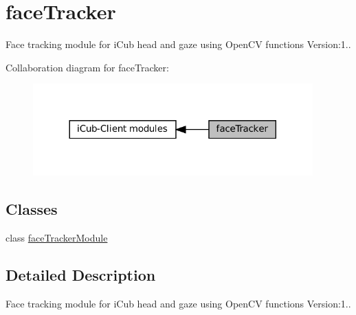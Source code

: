 \hypertarget{group__faceTracker}{}\section{face\+Tracker}
\label{group__faceTracker}


Face tracking module for i\+Cub head and gaze using Open\+CV functions Version\+:1..  


Collaboration diagram for face\+Tracker\+:
\nopagebreak
\begin{figure}[H]
\begin{center}
\leavevmode
\includegraphics[width=305pt]{group__faceTracker}
\end{center}
\end{figure}
\subsection*{Classes}
\begin{DoxyCompactItemize}
\item 
class \hyperlink{group__faceTracker_classfaceTrackerModule}{face\+Tracker\+Module}
\end{DoxyCompactItemize}


\subsection{Detailed Description}
Face tracking module for i\+Cub head and gaze using Open\+CV functions Version\+:1.. 


